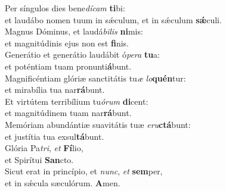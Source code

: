 \evenverse Per síngulos dies bene\textit{dí}\textit{cam} \textbf{ti}bi:~\*\\
\evenverse et laudábo nomen tuum in sǽculum, et in sǽculum \textbf{sǽ}culi.\\
\oddverse Magnus Dóminus, et laudá\textit{bi}\textit{lis} \textbf{ni}mis:~\*\\
\oddverse et magnitúdinis ejus non est \textbf{fi}nis.\\
\evenverse Generátio et generátio laudábit ó\textit{pe}\textit{ra} \textbf{tu}a:~\*\\
\evenverse et poténtiam tuam pronunti\textbf{á}bunt.\\
\oddverse Magnificéntiam glóriæ sanctitátis tu\textit{æ} \textit{lo}\textbf{quén}tur:~\*\\
\oddverse et mirabília tua nar\textbf{rá}bunt.\\
\evenverse Et virtútem terribílium tu\textit{ó}\textit{rum} \textbf{di}cent:~\*\\
\evenverse et magnitúdinem tuam nar\textbf{rá}bunt.\\
\oddverse Memóriam abundántiæ suavitátis tuæ \textit{e}\textit{ru}\textbf{ctá}bunt:~\*\\
\oddverse et justítia tua exsul\textbf{tá}bunt.\\
\evenverse Glória Pa\textit{tri}, \textit{et} \textbf{Fí}lio,~\*\\
\evenverse et Spirítui \textbf{San}cto.\\
\oddverse Sicut erat in princípio, et \textit{nunc}, \textit{et} \textbf{sem}per,~\*\\
\oddverse et in sǽcula sæculórum. \textbf{A}men.\\
